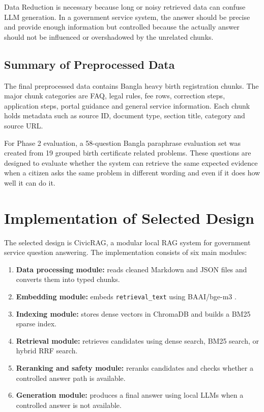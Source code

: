 \documentclass[12pt,oneside,openany]{report}
\begin{document}
Data Reduction is necessary because long or noisy retrieved data can confuse LLM generation. In a government service system, the answer should be precise and provide enough information but controlled because the actually answer should not be influenced or overshadowed by the unrelated chunks.

\subsection{Summary of Preprocessed Data}

The final preprocessed data contains Bangla heavy birth registration chunks. The major chunk categories are FAQ, legal rules, fee rows, correction steps, application steps, portal guidance and general service information. Each chunk holds metadata such as source ID, document type, section title, category and source URL.

For Phase 2 evaluation, a 58-question Bangla paraphrase evaluation set was created from 19 grouped birth certificate related problems. These questions are designed to evaluate whether the system can retrieve the same expected evidence when a citizen asks the same problem in different wording and even if it does how well it can do it.

\section{Implementation of Selected Design}

The selected design is CivicRAG, a modular local RAG system for government service question answering. The implementation consists of six main modules:

\begin{enumerate}
    \item \textbf{Data processing module:} reads cleaned Markdown and JSON files and converts them into typed chunks.
    \item \textbf{Embedding module:} embeds \texttt{retrieval\_text} using BAAI/bge-m3 \cite{chen2024bgem3}.
    \item \textbf{Indexing module:} stores dense vectors in ChromaDB and builds a BM25 sparse index.
    \item \textbf{Retrieval module:} retrieves candidates using dense search, BM25 search, or hybrid RRF search.
    \item \textbf{Reranking and safety module:} reranks candidates and checks whether a controlled answer path is available.
    \item \textbf{Generation module:} produces a final answer using local LLMs when a controlled answer is not available.
\end{enumerate}
\end{document}
